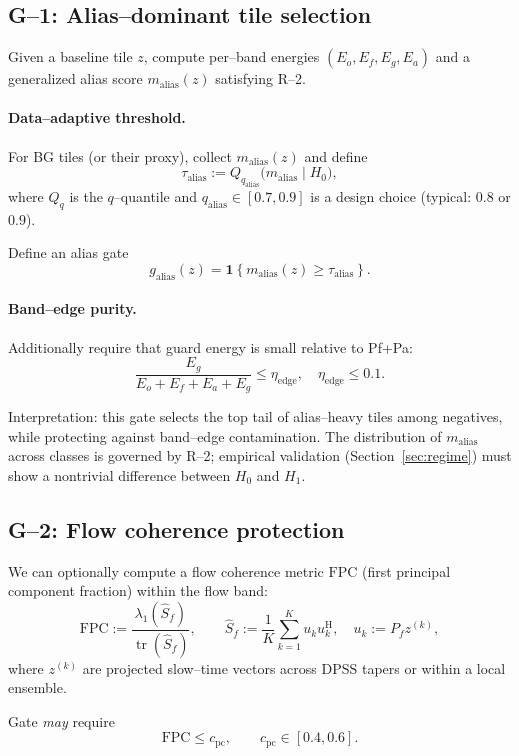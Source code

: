 \documentclass[11pt]{article}
\newcommand{\wh}{\widehat}
\newcommand{\Hh}{^{\mathrm{H}}}
\newcommand{\tr}{\operatorname{tr}}
\newcommand{\Pf}{P_f}
\begin{document}
\subsection{G--1: Alias--dominant tile selection}

Given a baseline tile $z$, compute per--band energies $(E_o,E_f,E_g,E_a)$ and a generalized alias score $m_{\mathrm{alias}}(z)$ satisfying R--2.

\paragraph{Data--adaptive threshold.}
For BG tiles (or their proxy), collect $m_{\mathrm{alias}}(z)$ and define
\[
\tau_{\mathrm{alias}} := Q_{q_{\mathrm{alias}}}\bigl(m_{\mathrm{alias}} \mid H_0\bigr),
\]
where $Q_q$ is the $q$--quantile and $q_{\mathrm{alias}}\in[0.7,0.9]$ is a design choice (typical: $0.8$ or $0.9$).

Define an alias gate
\[
g_{\mathrm{alias}}(z) = \mathbf{1}\left\{ m_{\mathrm{alias}}(z) \ge \tau_{\mathrm{alias}} \right\}.
\]

\paragraph{Band--edge purity.}
Additionally require that guard energy is small relative to Pf+Pa:
\[
\frac{E_g}{E_o + E_f + E_a + E_g} \le \eta_{\text{edge}},\quad
\eta_{\text{edge}}\le 0.1.
\]

Interpretation: this gate selects the top tail of alias--heavy tiles among negatives, while protecting against band--edge contamination. The distribution of $m_{\mathrm{alias}}$ across classes is governed by R--2; empirical validation (Section~\ref{sec:regime}) must show a nontrivial difference between $H_0$ and $H_1$.

\subsection{G--2: Flow coherence protection}

We can optionally compute a flow coherence metric $\mathrm{FPC}$ (first principal component fraction) within the flow band:
\[
\mathrm{FPC} := \frac{\lambda_1(\wh S_f)}{\tr(\wh S_f)},\qquad
\wh S_f := \frac{1}{K}\sum_{k=1}^K u_k u_k\Hh,\quad
u_k := \Pf z^{(k)},
\]
where $z^{(k)}$ are projected slow--time vectors across DPSS tapers or within a local ensemble.

Gate \emph{may} require
\[
\mathrm{FPC}\le c_{\text{pc}},\qquad c_{\text{pc}}\in[0.4,0.6].
\]
\end{document}
